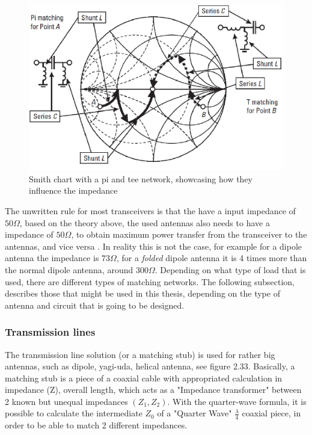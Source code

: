 \begin{figure}[h]
\centering
\includegraphics[scale=0.8]{figures/PiTeeSmithChart.PNG}
\caption{Smith chart\cite{SmithChart} with a pi and tee network, showcasing how they influence the impedance}
\end{figure}

The unwritten rule for most transceivers is that the have a input impedance of $50\Omega$, based on the theory above, the used antennas also needs to have a impedance of $50\Omega$, to obtain maximum power transfer from the transceiver to the antennas, and vice versa . In reality this is not the case, for example for a dipole antenna the impedance is $73\Omega$, for a \textit{folded} dipole antenna it is 4 times more than the normal dipole antenna, around $300\Omega$. Depending on what type of load that is used, there are different types of matching networks. The following subsection, describes those that might be used in this thesis, depending on the type of antenna and circuit that is going to be designed.

\subsubsection{Transmission lines}
The transmission line solution (or a matching stub) is used for rather big antennas, such as dipole, yagi-uda, helical antenna, see figure 2.33. Basically, a matching stub is a piece of a coaxial cable with appropriated calculation in impedance (Z), overall length, which acts as a "Impedance transformer" between 2 known but unequal impedances $(Z_1,Z_2)$. With the quarter-wave formula, it is possible to calculate the intermediate $Z_0$ of a "Quarter Wave" $\frac{\lambda}{4}$ coaxial piece, in order to be able to match 2 different impedances. 

